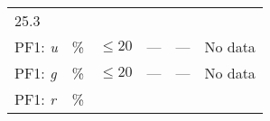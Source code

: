 \documentclass[DM,lsstdraft,toc]{lsstdoc}
\begin{document}
\begin{longtable}[]{@{}llllll@{}}
\begin{minipage}[t]{0.12\columnwidth}
25.3\strut
\end{minipage} & \begin{minipage}[t]{0.17\columnwidth}\raggedright\strut
\strut
\end{minipage}\tabularnewline
\begin{minipage}[t]{0.14\columnwidth}\raggedright\strut
PF1: \emph{u}\strut
\end{minipage} & \begin{minipage}[t]{0.06\columnwidth}\raggedright\strut
\%\strut
\end{minipage} & \begin{minipage}[t]{0.17\columnwidth}\raggedright\strut
\(\leq 20\)\strut
\end{minipage} & \begin{minipage}[t]{0.17\columnwidth}\raggedright\strut
---\strut
\end{minipage} & \begin{minipage}[t]{0.12\columnwidth}\raggedright\strut
---\strut
\end{minipage} & \begin{minipage}[t]{0.17\columnwidth}\raggedright\strut
No data\strut
\end{minipage}\tabularnewline
\begin{minipage}[t]{0.14\columnwidth}\raggedright\strut
PF1: \emph{g}\strut
\end{minipage} & \begin{minipage}[t]{0.06\columnwidth}\raggedright\strut
\%\strut
\end{minipage} & \begin{minipage}[t]{0.17\columnwidth}\raggedright\strut
\(\leq 20\)\strut
\end{minipage} & \begin{minipage}[t]{0.17\columnwidth}\raggedright\strut
---\strut
\end{minipage} & \begin{minipage}[t]{0.12\columnwidth}\raggedright\strut
---\strut
\end{minipage} & \begin{minipage}[t]{0.17\columnwidth}\raggedright\strut
No data\strut
\end{minipage}\tabularnewline
\begin{minipage}[t]{0.14\columnwidth}\raggedright\strut
PF1: \emph{r}\strut
\end{minipage} & \begin{minipage}[t]{0.06\columnwidth}\raggedright\strut
\%\strut
\end{minipage} & \begin{minipage}[t]{0.17\columnwidth}\raggedright\strut

\end{minipage}
\end{longtable}
\end{document}
